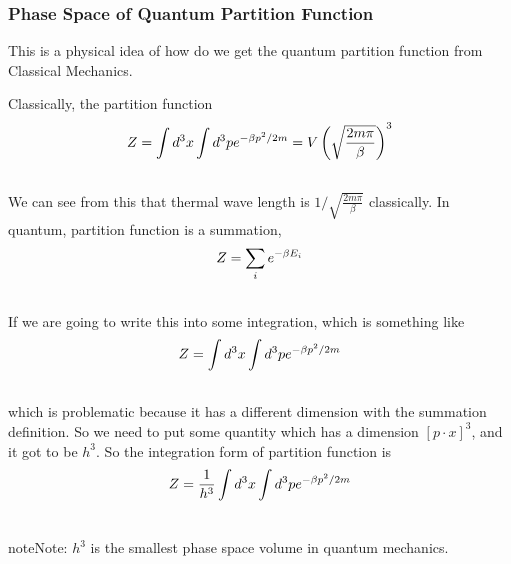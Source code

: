 \documentclass[letterpaper,10pt,english]{sphinxmanual}
\begin{document}
\subsubsection{Phase Space of Quantum Partition Function}
\label{equilibrium/week3:phase-space-of-quantum-partition-function}
This is a physical idea of how do we get the quantum partition function from Classical Mechanics.

Classically, the partition function
\begin{gather}
\begin{split}Z = \int d^3 x \int d^3 p e^{-\beta p^2/2m} = V \left( \sqrt{\frac{ 2m \pi }{\beta} } \right)^3\end{split}\notag\\\begin{split}\end{split}\notag
\end{gather}
We can see from this that thermal wave length is $1/\sqrt{\frac{ 2m \pi }{\beta}}$ classically. In quantum, partition function is a summation,
\begin{gather}
\begin{split}Z = \sum_i e^{-\beta E_i}\end{split}\notag\\\begin{split}\end{split}\notag
\end{gather}
If we are going to write this into some integration, which is something like
\begin{gather}
\begin{split}Z = \int d^3 x\int d^3 p e^{ -\beta p^2/2m }\end{split}\notag\\\begin{split}\end{split}\notag
\end{gather}
which is problematic because it has a different dimension with the summation definition. So we need to put some quantity which has a dimension $[p\cdot x ]^3$, and it got to be $h^3$. So the integration form of partition function is
\begin{gather}
\begin{split}Z = \frac{1}{h^3} \int d^3 x\int d^3 p e^{ -\beta p^2/2m }\end{split}\notag\\\begin{split}\end{split}\notag
\end{gather}
\begin{notice}{note}{Note:}
$h^3$ is the smallest phase space volume in quantum mechanics.
\end{notice}
\end{document}
